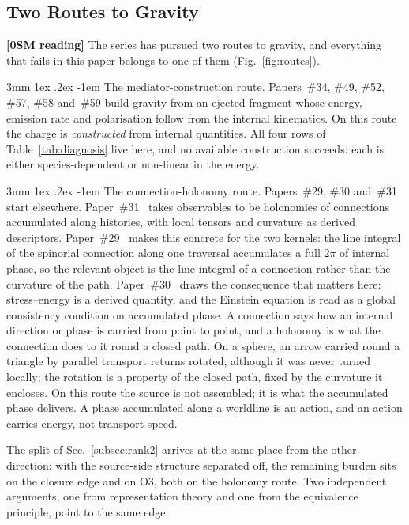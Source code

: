 \documentclass[%
 reprint, amsmath,amssymb, aps, prb, ]{revtex4-2}
\makeatletter
\numberwithin{equation}{section}
\renewcommand\paragraph{%
  \@startsection{paragraph}{4}{\z@}%
    {3mm \@plus 1ex \@minus .2ex}%
    {-1em}%
    {\normalfont\normalsize\itshape}}
\makeatother
\begin{document}
\subsection{Two Routes to Gravity}
\label{subsec:two_routes}

\textbf{[0SM reading]} The series has pursued two routes to gravity, and everything that fails in this paper belongs to one of them (Fig.~\ref{fig:routes}).

\paragraph{The mediator-construction route.} Papers~\#34, \#49, \#52, \#57, \#58 and~\#59 build gravity from an ejected fragment whose energy, emission rate and polarisation follow from the internal kinematics. On this route the charge is \emph{constructed} from internal quantities. All four rows of Table~\ref{tab:diagnosis} live here, and no available construction succeeds: each is either species-dependent or non-linear in the energy.

\paragraph{The connection-holonomy route.} Papers~\#29, \#30 and~\#31 start elsewhere. Paper~\#31~\cite{hanamura31} takes observables to be holonomies of connections accumulated along histories, with local tensors and curvature as derived descriptors. Paper~\#29~\cite{hanamura29} makes this concrete for the two kernels: the line integral of the spinorial connection along one traversal accumulates a full $2\pi$ of internal phase, so the relevant object is the line integral of a connection rather than the curvature of the path. Paper~\#30~\cite{hanamura30} draws the consequence that matters here: stress--energy is a derived quantity, and the Einstein equation is read as a global consistency condition on accumulated phase. A connection says how an internal direction or phase is carried from point to point, and a holonomy is what the connection does to it round a closed path. On a sphere, an arrow carried round a triangle by parallel transport returns rotated, although it was never turned locally; the rotation is a property of the closed path, fixed by the curvature it encloses. On this route the source is not assembled; it is what the accumulated phase delivers. A phase accumulated along a worldline is an action, and an action carries energy, not transport speed.

The split of Sec.~\ref{subsec:rank2} arrives at the same place from the other direction: with the source-side structure separated off, the remaining burden sits on the closure edge and on O3, both on the holonomy route. Two independent arguments, one from representation theory and one from the equivalence principle, point to the same edge.
\end{document}
